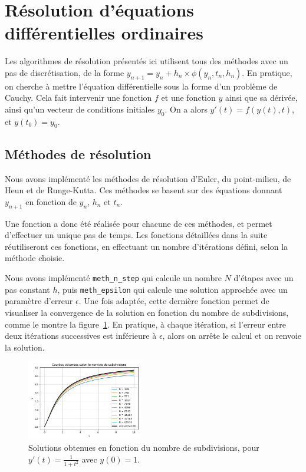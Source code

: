 \section{Résolution d'équations différentielles ordinaires}\label{sec:sec1}
Les algorithmes de résolution présentés ici utilisent tous des méthodes avec un pas de discrétisation, de la forme
$y_{n+1}=y_n+h_n \times \phi (y_n,t_n,h_n)$. En pratique, on cherche à mettre l'équation différentielle sous la forme d'un problème de Cauchy.
Cela fait intervenir une fonction $f$ et une fonction $y$ ainsi que sa dérivée, ainsi qu'un vecteur de conditions initiales $y_0$.
On a alors $y'(t)=f(y(t),t)$, et $y(t_0)=y_0$.

\subsection{Méthodes de résolution}
Nous avons implémenté les méthodes de résolution d’Euler, du point-milieu, de Heun et de Runge-Kutta.
Ces méthodes se basent sur des équations donnant $y_{n+1}$ en fonction de $y_n$, $h_n$ et $t_n$.

Une fonction a donc été réalisée pour chacune de ces méthodes, et permet d'effectuer un unique pas de temps.
Les fonctions détaillées dans la suite réutiliseront ces fonctions, en effectuant un nombre d'itérations défini, selon la méthode choisie.

Nous avons implémenté \texttt{meth\_n\_step} qui calcule un nombre $N$ d'étapes avec un pas constant $h$,
puis \texttt{meth\_epsilon} qui calcule une solution approchée avec un paramètre d’erreur $\epsilon$.
Une fois adaptée, cette dernière fonction permet de visualiser la convergence de la solution en fonction du nombre de subdivisions,
comme le montre la figure~\ref{fig:subdivision}.
En pratique, à chaque itération, si l'erreur entre deux itérations successives est inférieure à $\epsilon$,
alors on arrête le calcul et on renvoie la solution.

\begin{figure}[htbp!]
	\centering
	\includegraphics[width=0.45\textwidth]{res/subdivisions}
	\caption{Solutions obtenues en fonction du nombre de subdivisions, pour $y'(t) = \frac{1}{1 + t^2}$ avec $y(0) = 1$.}
	\label{fig:subdivision}
\end{figure}

